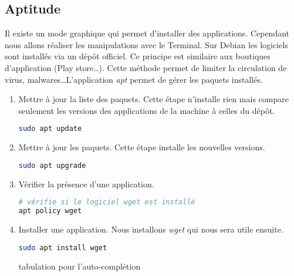 \documentclass[a4paper,11pt]{article}
\begin{document}
\subsection{Aptitude}
Il existe un mode graphique qui permet d'installer des applications. Cependant nous allons réaliser les manipulations avec le Terminal. Sur Debian les logiciels sont installés via un dépôt officiel. Ce principe est similaire aux boutiques d'application (Play store\dots). Cette méthode permet de limiter la circulation de virus, malwares\dots L'application \emph{apt} permet de gérer les paquets installés.
\begin{activite}
\begin{enumerate}
    \item Mettre à jour la liste des paquets. Cette étape n'installe rien mais compare seulement les versions des applications de la machine à celles du dépôt.
    \begin{lstlisting}[language=bash]
sudo apt update
\end{lstlisting}
    \item Mettre à jour les paquets. Cette étape installe les nouvelles versions.
    \begin{lstlisting}[language=bash]
sudo apt upgrade
\end{lstlisting}
    \item Vérifier la présence d'une application.
    \begin{lstlisting}[language=bash]
# vérifie si le logiciel wget est installé
apt policy wget
\end{lstlisting}
    \item Installer une application. Nous installons \emph{wget} qui nous sera utile ensuite.
    \begin{lstlisting}[language=bash]
sudo apt install wget
\end{lstlisting}
            \begin{commentprof}
            tabulation pour l'auto-complétion
            \end{commentprof}
\end{enumerate}
\end{activite}
\end{document}

